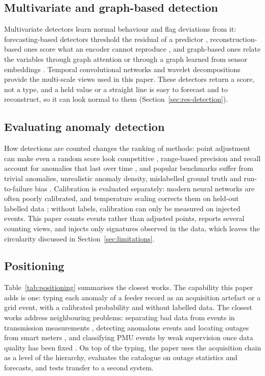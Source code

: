 \subsection{Multivariate and graph-based detection}\label{sec:rw-mts}

Multivariate detectors learn normal behaviour and flag deviations from it: forecasting-based detectors threshold the residual of a predictor \cite{hundman2018spacecraft}, reconstruction-based ones score what an encoder cannot reproduce \cite{su2019omnianomaly,audibert2020usad}, and graph-based ones relate the variables through graph attention \cite{zhao2020mtadgat,velickovic2018gat} or through a graph learned from sensor embeddings \cite{deng2021gdn}. Temporal convolutional networks \cite{bai2018tcn} and wavelet decompositions \cite{percival2000wavelet} provide the multi-scale views used in this paper. These detectors return a score, not a type, and a held value or a straight line is easy to forecast and to reconstruct, so it can look normal to them (Section~\ref{sec:res-detection}).

\subsection{Evaluating anomaly detection}\label{sec:rw-eval}

How detections are counted changes the ranking of methods: point adjustment can make even a random score look competitive \cite{kim2022rigorous}, range-based precision and recall account for anomalies that last over time \cite{tatbul2018precision}, and popular benchmarks suffer from trivial anomalies, unrealistic anomaly density, mislabelled ground truth and run-to-failure bias \cite{wu2023flawed}. Calibration is evaluated separately: modern neural networks are often poorly calibrated, and temperature scaling corrects them on held-out labelled data \cite{guo2017calibration}; without labels, calibration can only be measured on injected events. This paper counts events rather than adjusted points, reports several counting views, and injects only signatures observed in the data, which leaves the circularity discussed in Section~\ref{sec:limitations}.

\subsection{Positioning}\label{sec:positioning}

Table~\ref{tab:positioning} summarises the closest works. The capability this paper adds is one: typing each anomaly of a feeder record as an acquisition artefact or a grid event, with a calibrated probability and without labelled data. The closest works address neighbouring problems: separating bad data from events in transmission measurements \cite{wu2017lowquality,wu2021iforest}, detecting anomalous events and locating outages from smart meters \cite{moghaddass2018hierarchical,jiang2016outage}, and classifying PMU events by weak supervision once data quality has been fixed \cite{liu2022weakly}. On top of the typing, the paper uses the acquisition chain as a level of the hierarchy, evaluates the catalogue on outage statistics and forecasts, and tests transfer to a second system.

